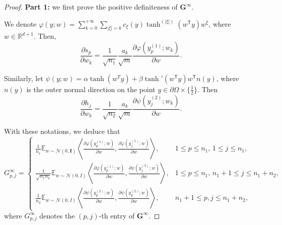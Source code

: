 \documentclass{article}
\newcommand{\T}{\mathsf{T}}
\begin{document}
\begin{proof} \textbf{Part 1:} we first prove the positive definiteness of $\mathbf{G}^{\infty}$.

We denote \(\varphi(y; w) = \sum_{k=0}^{+\infty} \sum_{|\xi|=k} c_{\xi}(y) \tanh^{(|\xi|)}(w^\T y)w^{\xi}\), where \(w  \in \mathbb{R}^{d+1}\). Then,
\begin{equation*}
    \frac{\partial s_p}{\partial w_k} = \frac{1}{\sqrt{n_1}} \frac{a_k}{\sqrt{m}}\frac{\partial \varphi(y_p^{(1)};w_k)}{\partial w}.
\end{equation*}

Similarly, let \(\psi(y; w) = \alpha \tanh(w^T y)+\beta \tanh'(w^\T y)w^\T n(y)\), 
where $n(y)$ is the outer normal direction on the point $y\in \partial\Omega \times \{\frac{1}{2}\}$.
Then
\begin{equation*}
\frac{\partial h_j}{\partial w_k} = \frac{1}{\sqrt{n_2}} \frac{a_k}{\sqrt{m}}\frac{\partial \psi(y_j^{(2)};w_k)}{\partial w}.
\end{equation*}

With these notations, we deduce that
\[
G^{\infty}_{p,j} =
\begin{cases}
\frac{1}{n_1} \mathbb{E}_{w \sim \mathcal{N}(0, \mathbf{I}) } \left\langle \frac{\partial \varphi(y_p^{(1)};w)}{\partial w}, \frac{\partial \varphi(y_j^{(1)};w)}{\partial w} \right\rangle, & 1 \leq p \leq n_1,\, 1 \leq j \leq n_1, \\
\frac{1}{\sqrt{n_1 n_2}} \mathbb{E}_{w \sim \mathcal{N}(0, I)} \left\langle \frac{\partial \varphi(y_p^{(1)};w)}{\partial w}, \frac{\partial \psi(y_j^{(2)};w)}{\partial w} \right\rangle, & 1 \leq p \leq n_1,\, n_1 + 1 \leq j \leq n_1 + n_2, \\
\frac{1}{n_2} \mathbb{E}_{w \sim \mathcal{N}(0, I)} \left\langle \frac{\partial \psi(y_p^{(2)};w)}{\partial w}, \frac{\partial \psi(y_p^{(2)};w)}{\partial w} \right\rangle, & n_1 + 1 \leq p, j \leq n_1 + n_2,
\end{cases}
\]
where \(G^{\infty}_{p, j}\) denotes the \((p, j)\)-th entry of \(\mathbf{G}^{\infty}\).


\end{proof}
\end{document}
